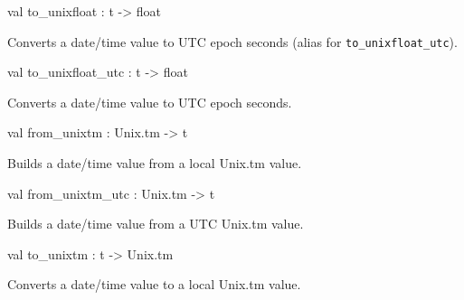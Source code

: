 \documentclass[11pt]{article}
\begin{document}
\label{val:XmlRpcDateTime.to-underscoreunixfloat}\begin{ocamldoccode}
val to_unixfloat : t -> float
\end{ocamldoccode}
\begin{ocamldocdescription}
Converts a date/time value to UTC epoch seconds (alias for {\tt{to\_unixfloat\_utc}}).


\end{ocamldocdescription}




\label{val:XmlRpcDateTime.to-underscoreunixfloat-underscoreutc}\begin{ocamldoccode}
val to_unixfloat_utc : t -> float
\end{ocamldoccode}
\begin{ocamldocdescription}
Converts a date/time value to UTC epoch seconds.


\end{ocamldocdescription}




\label{val:XmlRpcDateTime.from-underscoreunixtm}\begin{ocamldoccode}
val from_unixtm : Unix.tm -> t
\end{ocamldoccode}
\begin{ocamldocdescription}
Builds a date/time value from a local Unix.tm value.


\end{ocamldocdescription}




\label{val:XmlRpcDateTime.from-underscoreunixtm-underscoreutc}\begin{ocamldoccode}
val from_unixtm_utc : Unix.tm -> t
\end{ocamldoccode}
\begin{ocamldocdescription}
Builds a date/time value from a UTC Unix.tm value.


\end{ocamldocdescription}




\label{val:XmlRpcDateTime.to-underscoreunixtm}\begin{ocamldoccode}
val to_unixtm : t -> Unix.tm
\end{ocamldoccode}
\begin{ocamldocdescription}
Converts a date/time value to a local Unix.tm value.


\end{ocamldocdescription}
\end{document}
